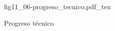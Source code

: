 \begin{figure}[h]
\centering
\def\svgwidth{0.5\textwidth}
{fig11_06-progreso_tecnico.pdf_tex}
\caption{Progreso técnico}
\label{fig11_06-progreso_tecnico}
\end{figure}